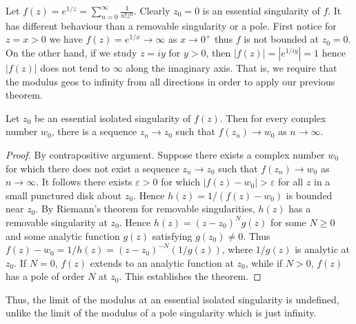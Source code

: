 \documentclass[12pt, a4paper, oneside, openright, titlepage]{book}
\begin{document}
\begin{eg}
    Let $f(z) = e^{1/z} = \sum_{n=0}^{\infty}\frac{1}{n!z^n}$. Clearly $z_0 = 0$ is an essential singularity of $f$. It has different behaviour than a removable singularity or a pole. First notice for $z = x > 0$ we have $f(z) = e^{1/x}\rightarrow \infty$ as $x\rightarrow 0^+$ thus $f$ is not bounded at $z_0 = 0$. On the other hand, if we study $z = iy$ for $y > 0$, then $|f(z)| = |e^{1/iy}| = 1$ hence $|f(z)|$ does not tend to $\infty$ along the imaginary axis. That is, we require that the modulus geos to infinity from all directions in order to apply our previous theorem.
\end{eg}

\begin{namthm}
    Let $z_0$ be an essential isolated singularity of $f(z)$. Then for every complex number $w_0$, there is a sequence $z_n \rightarrow z_0$ such that $f(z_n)\rightarrow w_0$ as $n\rightarrow \infty$.
\end{namthm}
\begin{proof}
    By contrapositive argument. Suppose there exists a complex number $w_0$ for which there does not exist a sequence $z_n\rightarrow z_0$ such that $f(z_n)\rightarrow w_0$ as $n\rightarrow \infty$. It follows there exists $\varepsilon > 0$ for which $|f(z) - w_0| > \varepsilon$ for all $z$ in a small punctured disk about $z_0$. Hence $h(z) = 1/(f(z)-w_0)$ is bounded near $z_0$. By Riemann's theorem for removable singularities, $h(z)$ has a removable singularity at $z_0$. Hence $h(z) = (z-z_0)^Ng(z)$ for some $N \geq 0$ and some analytic function $g(z)$ satisfying $g(z_0) \neq 0$. Thus $f(z) - w_0 = 1/h(z) = (z-z_0)^{-N}(1/g(z))$, where $1/g(z)$ is analytic at $z_0$. If $N = 0$, $f(z)$ extends to an analytic function at $z_0$, while if $N > 0$, $f(z)$ has a pole of order $N$ at $z_0$. This establishes the theorem.
\end{proof}

Thus, the limit of the modulus at an essential isolated singularity is undefined, unlike the limit of the modulus of a pole singularity which is just infinity.
\end{document}
